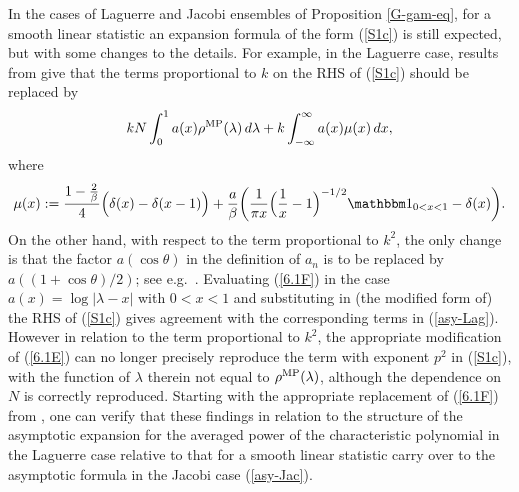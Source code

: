 \documentclass[11pt,a4paper]{article}
\numberwithin{equation}{section} %
\theoremstyle{plain}
\theoremstyle{definition}
\numberwithin{prop}{section}
\numberwithin{cor}{section}
\numberwithin{remark}{section}
\begin{document}
In the cases of Laguerre and Jacobi ensembles of Proposition \ref{G-gam-eq}, for a
smooth linear statistic an expansion formula of the form (\ref{S1c}) is still expected, but with some changes to the details. For example, in the Laguerre case, results from
\cite[Prop.~3.9 with a rescaling to account for $x \mapsto x/4$]{FRW17} give that the terms proportional to $k$ on the RHS of (\ref{S1c}) should be replaced by
 \begin{equation}\label{6.1F}
k N \int_0^1 a(x) \rho^{\rm MP}(\lambda) \, d \lambda + k \int_{-\infty}^\infty
a(x) \mu(x) \, dx,
\end{equation}
where 
\begin{equation}\label{6.1G}
\mu(x) := {1 - {2 \over \beta} \over 4} \Big ( \delta(x) - \delta(x-1) \Big ) +
{a \over \beta} \bigg ( {1 \over \pi x} \Big ( {1 \over x} - 1 \Big )^{-1/2}
\mathbbm 1_{0 < x < 1} - \delta(x) \bigg ).
\end{equation}
On the other hand, with respect to the term proportional to $k^2$, the only change is that the factor $a(\cos \theta)$ in the definition of $a_n$ is to be replaced
by $a((1+\cos \theta)/2)$; see e.g.~\cite[text below (3.37) with $c=0, d=1$]{Fo23}.
Evaluating (\ref{6.1F}) in the
case $a(x)  = \log |\lambda - x|$ with $0 < x < 1$ and substituting in (the modified
form of) the RHS of (\ref{S1c}) gives agreement with the corresponding terms in
(\ref{asy-Lag}). However in relation to the term proportional to $k^2$, the appropriate
modification of (\ref{6.1E}) can no longer precisely reproduce the term with exponent
$p^2$ in (\ref{S1c}), with the function of $\lambda$ therein not equal to
$\rho^{\rm MP}(\lambda)$, although the dependence on $N$ is correctly reproduced. 
Starting with the appropriate replacement of (\ref{6.1F}) from 
\cite[\S 4.3]{FRW17}, one can verify that these findings in relation to the
structure of the asymptotic expansion for the averaged power of
the characteristic polynomial in the Laguerre case relative to that for a smooth
linear statistic carry over to the asymptotic formula in the Jacobi case
(\ref{asy-Jac}).
\end{document}

